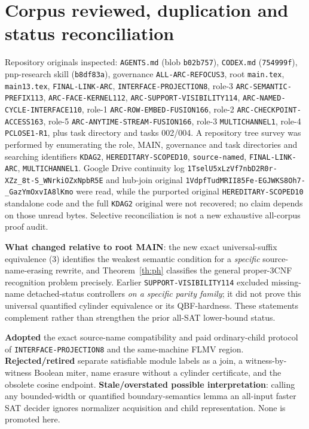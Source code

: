 \documentclass[11pt]{article}
\begin{document}
\section{Corpus reviewed, duplication and status reconciliation}
Repository originals inspected: \texttt{AGENTS.md} (blob
\texttt{b02b757}), \texttt{CODEX.md} (\texttt{754999f}),
pnp-research skill (\texttt{b8df83a}), governance
\texttt{ALL-ARC-REFOCUS3}, root \texttt{main.tex}, \texttt{main13.tex},
\texttt{FINAL-LINK-ARC}, \texttt{INTERFACE-PROJECTION8},
role-3 \texttt{ARC-SEMANTIC-PREFIX113},
\texttt{ARC-FACE-KERNEL112}, \texttt{ARC-SUPPORT-VISIBILITY114},
\texttt{ARC-NAMED-CYCLE-INTERFACE110}, role-1
\texttt{ARC-ROW-EMBED-FUSION166}, role-2
\texttt{ARC-CHECKPOINT-ACCESS163}, role-5
\texttt{ARC-ANYTIME-STREAM-FUSION166}, role-3
\texttt{MULTICHANNEL1}, role-4 \texttt{PCLOSE1-R1},
plus task directory and tasks 002/004. A repository tree survey
was performed by enumerating the role, MAIN, governance and task
directories and searching identifiers \texttt{KDAG2},
\texttt{HEREDITARY-SCOPED10}, \texttt{source-named},
\texttt{FINAL-LINK-ARC}, \texttt{MULTICHANNEL1}.
Google Drive continuity log
\texttt{1TselU5xLzVf7nbD2R0r-XZz\_8t-S\_WNrkiOZxNpbR5E}
and hub-join original
\texttt{1VdpfTudMRII85Fe-EGJWKS8Oh7-\_GazYmOxvIA8lKmo}
were read, while the purported original
\texttt{HEREDITARY-SCOPED10} standalone code and the full
\texttt{KDAG2} original were not recovered; no claim depends on
those unread bytes. Selective reconciliation is not a new
exhaustive all-corpus proof audit.

\textbf{What changed relative to root MAIN}: the new exact
universal-suffix equivalence (3) identifies the weakest semantic
condition for a \emph{specific} source-name-erasing rewrite, and
Theorem~\ref{th:ph} classifies the general proper-3CNF recognition
problem precisely. Earlier \texttt{SUPPORT-VISIBILITY114}
excluded missing-name detached-status controllers \emph{on a
specific parity family}; it did not prove this universal
quantified cylinder equivalence or its QBF-hardness. These
statements complement rather than strengthen the prior all-SAT
lower-bound status.

\textbf{Adopted} the exact source-name compatibility and paid
ordinary-child protocol of \texttt{INTERFACE-PROJECTION8} and
the same-machine FLMV region.
\textbf{Rejected/retired} separate satisfiable module labels as
a join, a witness-by-witness Boolean miter, name erasure without
a cylinder certificate, and the obsolete cosine endpoint.
\textbf{Stale/overstated possible interpretation}: calling any
bounded-width or quantified boundary-semantics lemma an
all-input faster SAT decider ignores normalizer acquisition
and child representation. None is promoted here.
\end{document}

